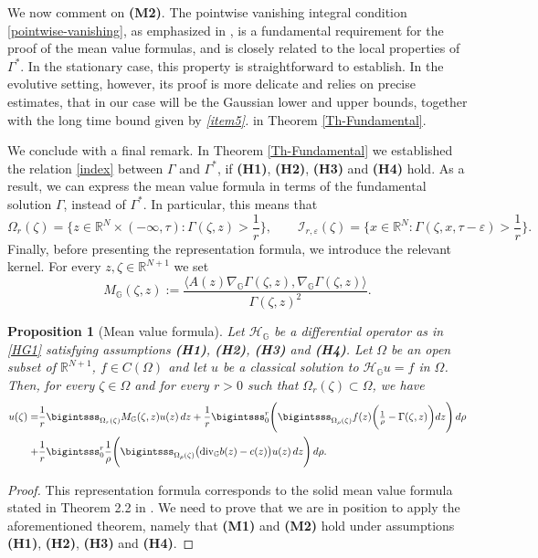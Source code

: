\documentclass[11pt,a4paper]{article}
\newtheorem{proposition}[theorem]{\bf Proposition}
\numberwithin{equation}{section}
\newcommand{\R}{\mathbb{R}}
\def \rnn {{\mathbb {R}}^{N+1}}
\def \GG {{\mathbb{G}}}
\def \div {{\text{\rm div}}}
\def \H {\mathscr{H}_\GG}
\def \G {{\Gamma}}
\def \e {{\varepsilon}}
\def \t {{\tau}}
\def \z {{\zeta}}
\begin{document}
{We now comment on \textbf{(M2)}. The pointwise vanishing integral condition \eqref{pointwise-vanishing}, as emphasized in \cite{CupiniLanconelli2021}, is a fundamental requirement for the proof of the mean value formulas, and is closely related to the local properties of $\G^*$. In the stationary case, this property is straightforward to establish. In the evolutive setting, however, its proof is more delicate and relies on precise estimates, that in our case will be the Gaussian lower and upper bounds, together with the long time bound given by \emph{\ref{item5}.} in Theorem \ref{Th-Fundamental}.
	
	
We conclude with a final remark. In Theorem \ref{Th-Fundamental} we established the relation \eqref{index} between $\G$ and $\G^*$, if \textbf{(H1)}, \textbf{(H2)}, \textbf{(H3)} and \textbf{(H4)} hold. As a result, we can express the mean value formula in terms of the fundamental solution $\G$, instead of $\G^*$. In particular, this means that 
\begin{equation}
	\Omega_r(\z)= \biggl\{ z \in \R^N \times (-\infty,\t): \Gamma(\z,z)>\frac{1}{r}\biggr\},\qquad \mathcal{I}_{r,\e}(\z)= \biggl\{ x \in \R^N : \Gamma(\z,x,\t-\e)>\frac{1}{r}\biggr\}.
\end{equation}
Finally, before presenting the representation formula, we introduce the relevant kernel. For every $z,\z\in\rnn$ we set 
\begin{equation}\label{Unbounded-kernel}
	M_\GG(\z,z):=\frac{\langle A(z)\nabla_{\GG} \G(\z,z),\nabla_{\GG}\G(\z,z) \rangle}{{\G(\z,z)}^2}.
\end{equation}
\begin{proposition}[Mean value formula]\label{Pr-meanvalue}
	Let $\H$ be a differential operator as in \eqref{HG1} satisfying assumptions \textbf{(H1)}, \textbf{(H2)}, \textbf{(H3)} and \textbf{(H4)}. Let $\Omega$ be an open subset of $\R^{N+1}$, $f \in C(\Omega)$ and let $u$ be a classical solution to $\H u =f$ in $\Omega$. Then, for every $\z \in \Omega$ and  for every $r>0$ such that ${\Omega_r(\z)} \subset \Omega$, we have 
	\begin{equation}
		\begin{aligned} 
			u(\z) =& \frac{1}{r} \bigintsss_{\Omega_r(\z)} M_\GG (\z, z) u(z) \, dz +\frac{1}{r}  \bigintsss_0^{r} \Biggl(
			\bigintsss_{\Omega_\rho (\z)} f (z) \biggl( \tfrac{1}{\rho} - \Gamma(\z,z) \biggr) dz \Biggr)\, d \rho
			\\+&\frac{1}{r} \bigintsss_0^{r}  \frac{1}{\rho} \Biggl(
			\bigintsss_{\Omega_\rho (\z)} \big( \div_\GG b(z) - c(z) \big) u(z) \, dz \Biggr) \, d \rho. 
		\end{aligned}
	\end{equation} 
\end{proposition}
\begin{proof}
	This representation formula corresponds to the solid mean value formula stated in Theorem 2.2 in \cite{pallara2023meanvalueformulasclassical}. We need to prove that we are in position to apply the aforementioned theorem, namely that \textbf{(M1)} and \textbf{(M2)} hold under assumptions \textbf{(H1)}, \textbf{(H2)}, \textbf{(H3)} and \textbf{(H4)}.
		

\end{proof}}
\end{document}
